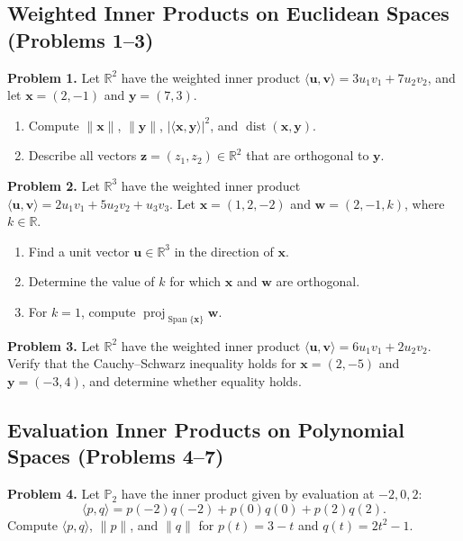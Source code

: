 \documentclass[11pt, letterpaper]{article}
\theoremstyle{definition}
\theoremstyle{remark}
\begin{document}
\subsection{Weighted Inner Products on Euclidean Spaces (Problems 1--3)}

\textbf{Problem 1.} Let $\mathbb{R}^2$ have the weighted inner product $\langle \mathbf{u}, \mathbf{v} \rangle = 3u_1v_1 + 7u_2v_2$, and let $\mathbf{x} = (2, -1)$ and $\mathbf{y} = (7, 3)$.
\begin{enumerate}[label=(\alph*)]
    \item Compute $\|\mathbf{x}\|$, $\|\mathbf{y}\|$, $|\langle \mathbf{x}, \mathbf{y} \rangle|^2$, and $\operatorname{dist}(\mathbf{x}, \mathbf{y})$.
    \item Describe all vectors $\mathbf{z} = (z_1, z_2) \in \mathbb{R}^2$ that are orthogonal to $\mathbf{y}$.
\end{enumerate}

\textbf{Problem 2.} Let $\mathbb{R}^3$ have the weighted inner product $\langle \mathbf{u}, \mathbf{v} \rangle = 2u_1v_1 + 5u_2v_2 + u_3v_3$. Let $\mathbf{x} = (1, 2, -2)$ and $\mathbf{w} = (2, -1, k)$, where $k \in \mathbb{R}$.
\begin{enumerate}[label=(\alph*)]
    \item Find a unit vector $\mathbf{u} \in \mathbb{R}^3$ in the direction of $\mathbf{x}$.
    \item Determine the value of $k$ for which $\mathbf{x}$ and $\mathbf{w}$ are orthogonal.
    \item For $k = 1$, compute $\operatorname{proj}_{\operatorname{Span}\{\mathbf{x}\}} \mathbf{w}$.
\end{enumerate}

\textbf{Problem 3.} Let $\mathbb{R}^2$ have the weighted inner product $\langle \mathbf{u}, \mathbf{v} \rangle = 6u_1v_1 + 2u_2v_2$. Verify that the Cauchy--Schwarz inequality holds for $\mathbf{x} = (2, -5)$ and $\mathbf{y} = (-3, 4)$, and determine whether equality holds.

\subsection{Evaluation Inner Products on Polynomial Spaces (Problems 4--7)}

\textbf{Problem 4.} Let $\mathbb{P}_2$ have the inner product given by evaluation at $-2, 0, 2$:
\[
\langle p, q \rangle = p(-2)q(-2) + p(0)q(0) + p(2)q(2).
\]
Compute $\langle p, q \rangle$, $\|p\|$, and $\|q\|$ for $p(t) = 3 - t$ and $q(t) = 2t^2 - 1$.
\end{document}
